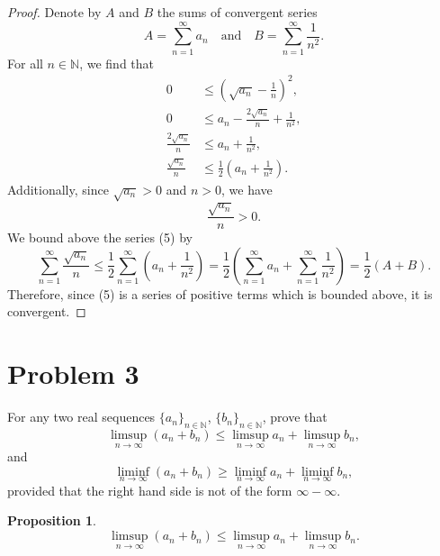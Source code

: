 \documentclass[12pt]{article}
\newtheorem{proposition}{Proposition}
\newenvironment{problem}
    {\begin{lrbox}{\mybox}\begin{minipage}{0.98\textwidth}}
    {\end{minipage}\end{lrbox}\framebox[\textwidth]{\usebox{\mybox}}}
\newcommand{\isp}[1]{\quad\text{#1}\quad}
\newcommand{\N}{\mathbb{N}} %
\newcommand{\<}{\left\langle} %
\renewcommand{\>}{\right\rangle} %
\begin{document}
\begin{proof}
    Denote by $A$ and $B$ the sums of convergent series
    \[
        A = \sum_{n = 1}^\infty a_n \isp{and} B = \sum_{n = 1}^\infty \frac{1}{n^2}.
    \]
    For all $n \in \N$, we find that
    \begin{align*}
        0 &\leq \left( \sqrt{a_n} - \frac1n \right)^2, \\[1em]
        0 &\leq a_n - \frac{2 \sqrt{a_n}}{n} + \frac{1}{n^2}, \\[1em]
        \frac{2 \sqrt{a_n}}{n} &\leq a_n + \frac{1}{n^2}, \\[1em]
        \frac{\sqrt{a_n}}{n} &\leq \frac12 \left( a_n + \frac{1}{n^2} \right).
    \end{align*}
    Additionally, since $\sqrt{a_n} > 0$ and $n > 0$, we have
    \[
        \frac{\sqrt{a_n}}{n} > 0.
    \]
    We bound above the series (5) by
    \[
        \sum_{n = 1}^\infty \frac{\sqrt{a_n}}{n} \leq \frac12 \sum_{n = 1}^\infty \left( a_n + \frac{1}{n^2} \right) = \frac12 \left( \sum_{n = 1}^\infty a_n + \sum_{n = 1}^\infty \frac{1}{n^2} \right) = \frac12 (A + B).
    \]
    Therefore, since (5)  is a series of positive terms which is bounded above, it is convergent.
    
\end{proof}

\newpage
\section*{Problem 3}
\begin{problem}
    For any two real sequences $\{a_n\}_{n\in\N}$, $\{b_n\}_{n\in\N}$, prove that 
    \begin{equation}
        \limsup _{n\to \infty} (a_n+b_n) \le \limsup _{n\to \infty} a_n +\limsup _{n\to \infty} b_n,
    \end{equation}
    and 
    \begin{equation}
        \liminf _{n\to \infty} (a_n+b_n) \ge \liminf _{n\to \infty} a_n +\liminf _{n\to \infty} b_n,
    \end{equation}
    provided that the right hand side is not of the form $\infty - \infty$.
\end{problem}

\begin{proposition}
    \[
        \limsup _{n\to \infty} (a_n+b_n) \le \limsup _{n\to \infty} a_n + \limsup _{n\to \infty} b_n.
    \]
\end{proposition}
\end{document}
